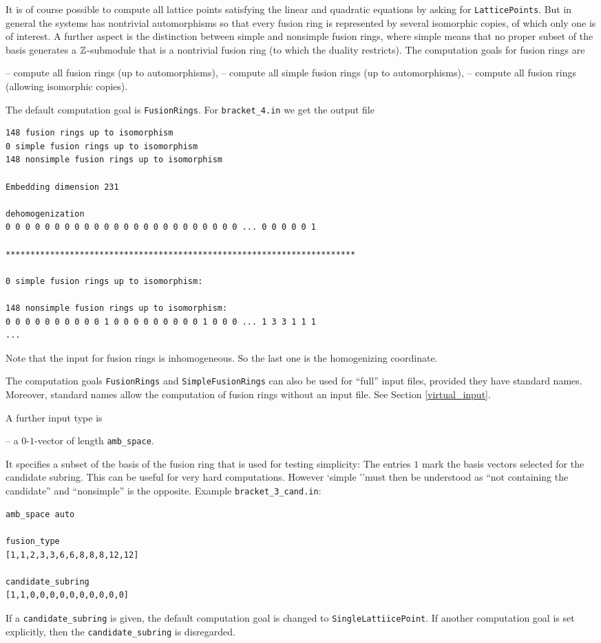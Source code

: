 It is of course possible to compute all lattice points satisfying the linear and quadratic equations by asking for \verb*|LatticePoints|. But in general the systems has nontrivial automorphisms so that every fusion ring is represented by several isomorphic copies, of which only one is of interest. A further aspect is the distinction between simple and nonsimple fusion rings, where simple means that no proper subset of the basis generates a ${\mathbb Z}$-submodule that is a nontrivial fusion ring (to which the duality restricts). The computation goals for fusion rings are
\begin{itemize}
	\itemtt[FusionRings] -- compute all fusion rings (up to automorphisms),
	\itemtt[SimpleFusionRings] -- compute all simple fusion rings (up to automorphisms),
	\itemtt[LatticePoints] -- compute all fusion rings (allowing isomorphic copies).
\end{itemize}
The default computation goal is \verb*|FusionRings|. For
\verb*|bracket_4.in| we get the output file 
\begin{Verbatim}
148 fusion rings up to isomorphism
0 simple fusion rings up to isomorphism
148 nonsimple fusion rings up to isomorphism

Embedding dimension 231

dehomogenization
0 0 0 0 0 0 0 0 0 0 0 0 0 0 0 0 0 0 0 0 0 0 0 0 ... 0 0 0 0 0 1

***********************************************************************

0 simple fusion rings up to isomorphism:

148 nonsimple fusion rings up to isomorphism:
0 0 0 0 0 0 0 0 0 0 1 0 0 0 0 0 0 0 0 0 1 0 0 0 ... 1 3 3 1 1 1
...
\end{Verbatim}
Note that the input for fusion rings is inhomogeneous. So the last one is the homogenizing coordinate.

The computation goals \verb*|FusionRings|  and \verb*|SimpleFusionRings| can also be used for ``full'' input files, provided they have standard names. Moreover, standard names allow the computation of fusion rings without an input file. See Section \ref{virtual_input}.

A further input type is
\begin{itemize}
	  -- a $0$-$1$-vector of length \verb*|amb_space|.
\end{itemize}
It specifies a subset of the basis of the fusion ring that is used for testing simplicity: The entries $1$ mark the basis vectors selected for the candidate subring. 
This can be useful for very hard computations. However `simple ''must then be understood as ``not containing the candidate'' and ``nonsimple'' is the opposite. Example \verb*|bracket_3_cand.in|:
\begin{Verbatim}
amb_space auto

fusion_type
[1,1,2,3,3,6,6,8,8,8,12,12]

candidate_subring
[1,1,0,0,0,0,0,0,0,0,0,0]
\end{Verbatim}
If a \verb*|candidate_subring| is given, the default computation goal is changed to \verb*|SingleLattiicePoint|. If another computation goal is set explicitly, then the \verb*|candidate_subring| is disregarded.

